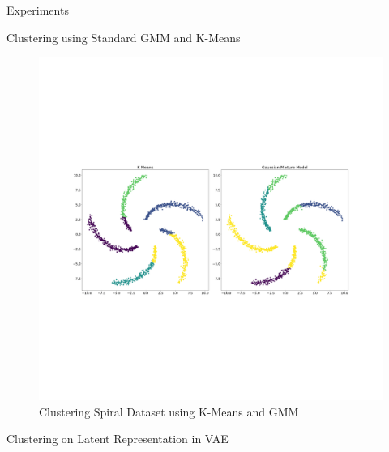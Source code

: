 \documentclass{article}
\begin{document}
\begin{psection}{Experiments}

	\begin{psubsection}{Clustering using Standard GMM and K-Means}

		\begin{figure}[H]
			\captionsetup{justification=centering,margin=0.8cm}
			\centering
			\includegraphics[trim={5cm 32cm 0 34cm},clip,scale=0.14]{includes/clustering.png}
			\caption*{Clustering Spiral Dataset using K-Means and GMM}
		\end{figure}

	\end{psubsection}

	\begin{psubsection}{Clustering on Latent Representation in VAE}


\end{psubsection}
\end{psection}
\end{document}
